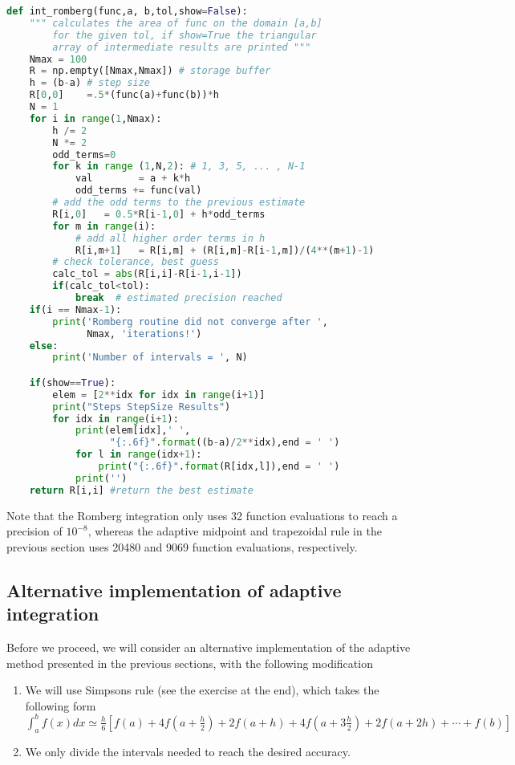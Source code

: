 \documentclass[graybox,sectrefs,envcountresetchap,open=right,final]{svmonodo}
\begin{document}
\begin{lstlisting}[language=python,style=blue1]
def int_romberg(func,a, b,tol,show=False):
    """ calculates the area of func on the domain [a,b]
        for the given tol, if show=True the triangular
        array of intermediate results are printed """
    Nmax = 100
    R = np.empty([Nmax,Nmax]) # storage buffer
    h = (b-a) # step size
    R[0,0]    =.5*(func(a)+func(b))*h
    N = 1
    for i in range(1,Nmax):
        h /= 2
        N *= 2
        odd_terms=0
        for k in range (1,N,2): # 1, 3, 5, ... , N-1
            val        = a + k*h
            odd_terms += func(val)
		# add the odd terms to the previous estimate	
        R[i,0]   = 0.5*R[i-1,0] + h*odd_terms 
        for m in range(i): 
			# add all higher order terms in h
            R[i,m+1]   = R[i,m] + (R[i,m]-R[i-1,m])/(4**(m+1)-1)                  
		# check tolerance, best guess			
        calc_tol = abs(R[i,i]-R[i-1,i-1])       
        if(calc_tol<tol):
            break  # estimated precision reached 
    if(i == Nmax-1):
        print('Romberg routine did not converge after ',
              Nmax, 'iterations!')
    else:      
        print('Number of intervals = ', N)

    if(show==True):
        elem = [2**idx for idx in range(i+1)]
        print("Steps StepSize Results")
        for idx in range(i+1):
            print(elem[idx],' ',
                  "{:.6f}".format((b-a)/2**idx),end = ' ')
            for l in range(idx+1):
                print("{:.6f}".format(R[idx,l]),end = ' ')
            print('')  
    return R[i,i] #return the best estimate

\end{lstlisting}


Note that the Romberg integration only uses 32 function evaluations to reach a precision of $10^{-8}$, whereas the adaptive midpoint and trapezoidal rule in the previous
section uses 20480 and 9069 function evaluations, respectively. 

\subsection{Alternative implementation of adaptive integration}
Before we proceed, we will consider an alternative implementation of the adaptive method presented in the previous sections, with the following modification
\begin{enumerate}
\item We will use Simpsons rule (see the exercise at the end), which takes the following form $\int_a^bf(x)dx\simeq\frac{h}{6}\left[f(a)+4f(a+\frac{h}{2})+2f(a+h)+ 4f(a+3\frac{h}{2})+2f(a+2h)+\cdots+f(b)\right]$

\item We only divide the intervals needed to reach the desired accuracy.
\end{enumerate}
\end{document}
